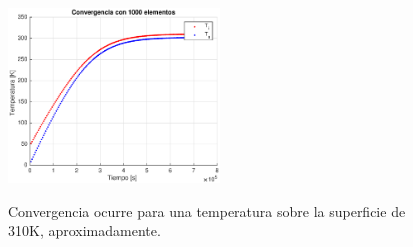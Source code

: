\documentclass[onecolumn,10pt,titlepage,a4paper]{article}
\begin{document}
\begin{figure}[htb!]
	\centering
	\includegraphics[width=0.5\textwidth]{fig/convergencia1000.eps}
\label{fig:Convergencia1000}
\caption{Convergencia ocurre para una temperatura sobre la superficie de 310K,
	 aproximadamente.}
\end{figure}
\end{document}
